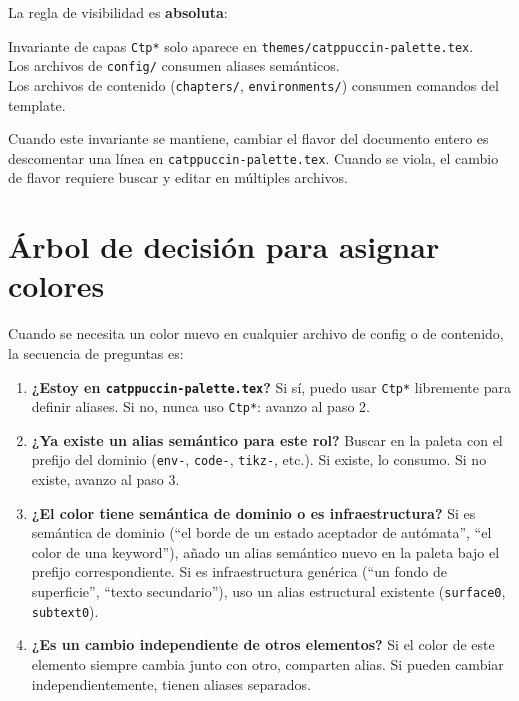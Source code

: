 La regla de visibilidad es \textbf{absoluta}:

\begin{estrella}{Invariante de capas}
\label{ap:star:invariante}
\texttt{Ctp*} solo aparece en \texttt{themes/catppuccin-palette.tex}.\\
Los archivos de \texttt{config/} consumen aliases semánticos.\\
Los archivos de contenido (\texttt{chapters/}, \texttt{environments/})
consumen comandos del template.

Cuando este invariante se mantiene, cambiar el flavor del documento
entero es descomentar una línea en \texttt{catppuccin-palette.tex}.
Cuando se viola, el cambio de flavor requiere buscar y editar en
múltiples archivos.
\end{estrella}

\section{Árbol de decisión para asignar colores}
\label{ap:sec:decision}

Cuando se necesita un color nuevo en cualquier archivo de config o de
contenido, la secuencia de preguntas es:

\begin{enumerate}[label=\textbf{\arabic*.}, leftmargin=2em]
  \item \textbf{¿Estoy en \texttt{catppuccin-palette.tex}?}
    Si sí, puedo usar \texttt{Ctp*} libremente para definir aliases.
    Si no, nunca uso \texttt{Ctp*}: avanzo al paso 2.

  \item \textbf{¿Ya existe un alias semántico para este rol?}
    Buscar en la paleta con el prefijo del dominio (\texttt{env-},
    \texttt{code-}, \texttt{tikz-}, etc.). Si existe, lo consumo.
    Si no existe, avanzo al paso 3.

  \item \textbf{¿El color tiene semántica de dominio o es infraestructura?}
    Si es semántica de dominio (``el borde de un estado aceptador de
    autómata'', ``el color de una keyword''), añado un alias semántico
    nuevo en la paleta bajo el prefijo correspondiente.
    Si es infraestructura genérica (``un fondo de superficie'', ``texto
    secundario''), uso un alias estructural existente (\texttt{surface0},
    \texttt{subtext0}).

  \item \textbf{¿Es un cambio independiente de otros elementos?}
    Si el color de este elemento siempre cambia junto con otro, comparten
    alias. Si pueden cambiar independientemente, tienen aliases separados.
\end{enumerate}

